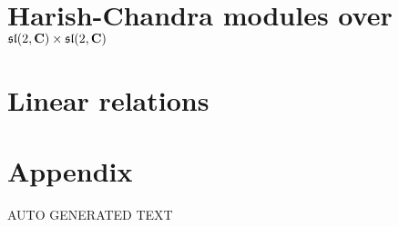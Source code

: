 \documentclass[]{./Bachelor}
\begin{document}
\frontmatter




\tableofcontents*

\mainmatter
\clearpage
\pagestyle{ruled}

\chapter{Harish-Chandra modules over \texorpdfstring{$\mathfrak{sl}(2,\mathbf{C})\times \mathfrak{sl}(2,\mathbf{C})$}{sl(2,C) x sl(2,C)}}\nocite{*}
\label{cha:first}





\chapter{Linear relations}
\label{cha:second}

\medskip

\printbibliography


\appendix

\chapter{Appendix}

AUTO GENERATED TEXT

\kant
\end{document}
